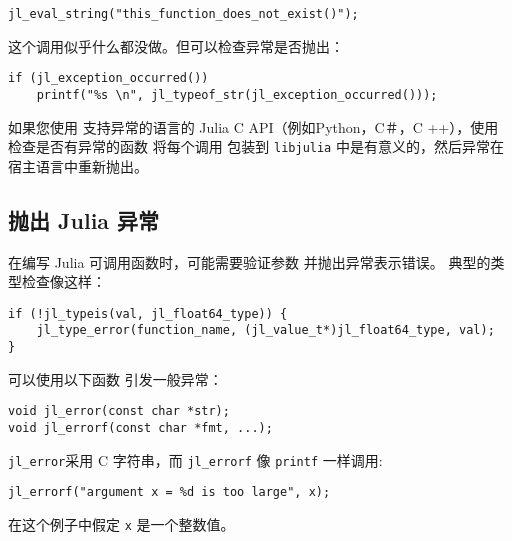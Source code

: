 \begin{lstlisting}
jl_eval_string("this_function_does_not_exist()");
\end{lstlisting}



这个调用似乎什么都没做。但可以检查异常是否抛出：




\begin{lstlisting}
if (jl_exception_occurred())
    printf("%s \n", jl_typeof_str(jl_exception_occurred()));
\end{lstlisting}



如果您使用 支持异常的语言的 Julia C API（例如Python，C＃，C ++），使用 检查是否有异常的函数 将每个调用 包装到 \texttt{libjulia} 中是有意义的，然后异常在宿主语言中重新抛出。



\hypertarget{3345506826925468977}{}


\subsection{抛出 Julia 异常}



在编写 Julia 可调用函数时，可能需要验证参数 并抛出异常表示错误。 典型的类型检查像这样：




\begin{lstlisting}
if (!jl_typeis(val, jl_float64_type)) {
    jl_type_error(function_name, (jl_value_t*)jl_float64_type, val);
}
\end{lstlisting}



可以使用以下函数 引发一般异常：




\begin{lstlisting}
void jl_error(const char *str);
void jl_errorf(const char *fmt, ...);
\end{lstlisting}



\texttt{jl\_error}采用 C 字符串，而 \texttt{jl\_errorf} 像 \texttt{printf} 一样调用:




\begin{lstlisting}
jl_errorf("argument x = %d is too large", x);
\end{lstlisting}



在这个例子中假定 \texttt{x} 是一个整数值。



